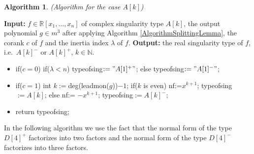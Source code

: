 \documentclass{amsproc}
\begin{document}
\newtheorem{A[k]}[kjet]{Algorithm}
\begin{A[k]}(Algorithm for the case $A[k]$)
\end{A[k]}
\noindent\textnormal{\bf Input:} $f\in \mathbb R[x_1,\ldots,x_n]$ of complex singularity type $A[k]$, the output polynomial $g\in m^3$ after applying Algorithm \ref{AlgorithmSplittingLemma}, the corank $c$ of $f$ and the inertia index $\lambda$ of $f$.\newline
\textnormal{\bf Output:} the real singularity type of $f$, i.e.~$A[k]^-$ or $A[k]^+$, $k\in\mathbb N$.
\begin{itemize}
\item if($c=0$)\newline
\phantom{}\quad if($\lambda<n$)\newline
\phantom{}\quad\quad typeofsing$:="A[1]^+"$;\newline
\phantom{}\quad else\newline
\phantom{}\quad\quad typeofsing$:="A[1]^-"$;
\item if($c=1$)\newline
\phantom{}\quad int $k:= $deg(leadmon($g$))$ -1$;\newline
\phantom{}\quad if($k$ is even)\newline
\phantom{}\quad\quad nf:=$x^{k+1}$;\newline
\phantom{}\quad\quad typeofsing$:= A[k]$;\newline
\phantom{}\quad else\newline
\phantom{}\quad\quad nf:= $-x^{k+1}$;\newline
\phantom{}\quad\quad typeofsing$:= A[k]^-;$
\item return typeofsing;
\end{itemize}

In the following algorithm we use the fact that the normal form of the type
$D[4]^+$ factorizes into two factors and the normal form of the type $D[4]^-$
factorizes into three factors. 
\end{document}
